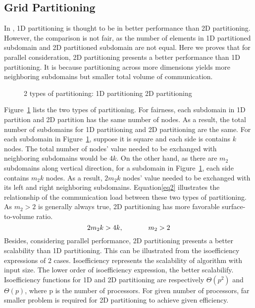 \documentclass{sig-alternate}
\begin{document}
  \subsection{Grid Partitioning}
	In \cite{Zhongyu}, 1D partitioning is thought to be in better performance than 2D partitioning. However, the comparison is not 
	fair, as the number of elements in 1D partitioned subdomain and 2D partitioned subdomain are not equal. Here we proves that
	for parallel consideration, 2D partitioning presents a better performance than 1D partitioning. It is because 
	partitioning across more dimensions yields more neighboring subdomains but smaller total volume of communication.
	\begin{figure}[htbp]
	  \caption{2 types of partitioning:
	   1D partitioning
	   2D partitioning }
	  \label{Fig3}
	\end{figure}
	Figure~\ref{Fig3} lists the two types of partitioning. For fairness, each subdomain in 1D partition and 2D partition has the 
	same number of nodes. As a result, the total number of subdomains for 1D partitioning and 2D partitioning are the same. For 
	each subdomain 
	in Figure~\ref{Fig3}, suppose it is square and each side is contains $k$ nodes. The total 
	number of nodes' value needed to be exchanged with neighboring subdomains would be $4k$. On the other hand, as 
	there are $m_2$ subdomains along vertical direction, for a subdomain in Figure~\ref{Fig3}, each side contains
	$m_2k$ nodes. As a result, $2m_2k$ nodes' value needed to be exchanged with its left and right 
	neighboring subdomains. Equation\eqref{eq2} illustrates the relationship of the communication load between these two types of
	partitioning. As $m_2>2$ is generally always true, 2D partitioning has more favorable surface-to-volume ratio.    
	\begin{equation}
		2m_2k > 4k, \hspace{0.5 in} m_2 > 2 \label{eq2}
	\end{equation}
	Besides, considering parallel performance, 2D partitioning presents a better scalability than 1D partitioning. This can be
	illustrated from the isoefficiency expressions of 2 cases. Isoefficiency represents the scalability of algorithm
	with input size. The lower order of isoefficiency expression, the better scalabilify. Isoefficiency functions for 1D 
	and 2D partitioning are respectively $\Theta(p^2)$ and $\Theta(p)$\cite{Grama, Kumar}, where p is the number of processors. 
	For given number of processors, far smaller problem is required for 2D partitioning to achieve given efficiency.
\end{document}
